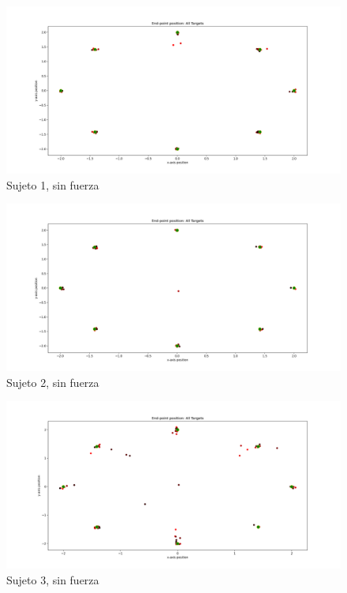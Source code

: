 \documentclass[a4paper,11pt, oneside]{book}
\begin{document}
\begin{figure}[H]
	\centering
	\includegraphics[width=\linewidth]{sujeto1/no_force/trayectorias_puntos}
	\caption{Sujeto 1, sin fuerza}
	\label{1-1-1}
\end{figure}
\begin{figure}[H]
	\centering
	\includegraphics[width=\linewidth]{sujeto2/no_force/trayectorias_puntos}
	\caption{Sujeto 2, sin fuerza}
	\label{2-1-1}
\end{figure}
\begin{figure}[H]
	\centering
	\includegraphics[width=\linewidth]{sujeto3/no_force/trayectorias_puntos}
	\caption{Sujeto 3, sin fuerza}
	\label{3-1-1}
\end{figure}
\end{document}
